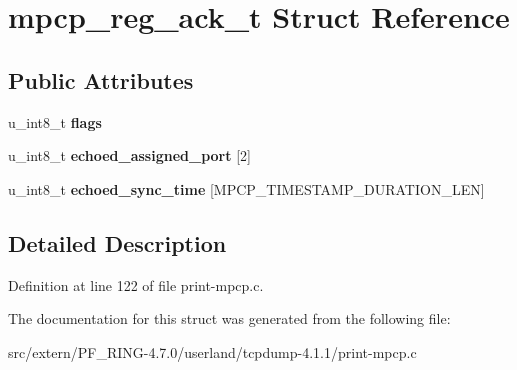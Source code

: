 \hypertarget{structmpcp__reg__ack__t}{
\section{mpcp\_\-reg\_\-ack\_\-t Struct Reference}
\label{structmpcp__reg__ack__t}
}
\subsection*{Public Attributes}
\begin{DoxyCompactItemize}
\item 
\hypertarget{structmpcp__reg__ack__t_a3b1b97dd94da7d7affe4f53f4539939b}{
u\_\-int8\_\-t {\bfseries flags}}
\label{structmpcp__reg__ack__t_a3b1b97dd94da7d7affe4f53f4539939b}

\item 
\hypertarget{structmpcp__reg__ack__t_aa66381fa25255a68c5f92235e8120e87}{
u\_\-int8\_\-t {\bfseries echoed\_\-assigned\_\-port} \mbox{[}2\mbox{]}}
\label{structmpcp__reg__ack__t_aa66381fa25255a68c5f92235e8120e87}

\item 
\hypertarget{structmpcp__reg__ack__t_acbad4e41e4dd63012a72bf774bdf19de}{
u\_\-int8\_\-t {\bfseries echoed\_\-sync\_\-time} \mbox{[}MPCP\_\-TIMESTAMP\_\-DURATION\_\-LEN\mbox{]}}
\label{structmpcp__reg__ack__t_acbad4e41e4dd63012a72bf774bdf19de}

\end{DoxyCompactItemize}


\subsection{Detailed Description}


Definition at line 122 of file print-\/mpcp.c.



The documentation for this struct was generated from the following file:\begin{DoxyCompactItemize}
\item 
src/extern/PF\_\-RING-\/4.7.0/userland/tcpdump-\/4.1.1/print-\/mpcp.c\end{DoxyCompactItemize}
